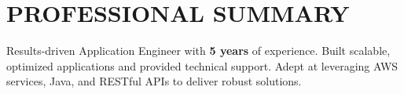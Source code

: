 \section{PROFESSIONAL SUMMARY}
\begin{onecolentry}
    Results-driven Application Engineer with \textbf{5 years} of experience. Built scalable, optimized applications and provided technical support. Adept at leveraging AWS services, Java, and RESTful APIs to deliver robust solutions.
\end{onecolentry}
